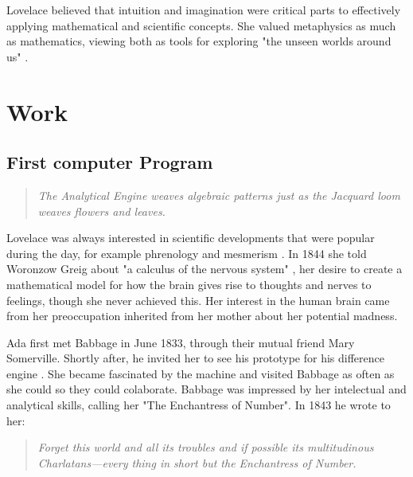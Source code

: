 \documentclass{article}
\begin{document}
Lovelace believed that intuition and imagination were critical parts to effectively applying mathematical and scientific concepts. She valued metaphysics as much as mathematics, viewing both as tools for exploring "the unseen worlds around us" \cite{Toole}.

\newpage

\section{Work}

\subsection{First computer Program}

\vspace*{\fill}
\begin{quote}
    \textit{
        The Analytical Engine weaves algebraic patterns just as the Jacquard loom weaves flowers and leaves.
    }
    \cite{AdaLovelaceBabbageEngine}
\end{quote}
\vspace*{\fill}

Lovelace was always interested in scientific developments that were popular during the day, for example phrenology \cite{Phrenology} and mesmerism \cite{Mesmerism}. In 1844 she told Woronzow Greig about "a calculus of the nervous system" \cite{CalculusOfNervousSystem}, her desire to create a mathematical model for how the brain gives rise to thoughts and nerves to feelings, though she never achieved this. Her interest in the human brain came from her preoccupation inherited from her mother about her potential madness.

\vspace{0.3cm}

Ada first met Babbage in June 1833, through their mutual friend Mary Somerville. Shortly after, he invited her to see his prototype for his difference engine \cite{Toole}. She became fascinated by the machine and visited Babbage as often as she could so they could colaborate. Babbage was impressed by her intelectual and analytical skills, calling her "The Enchantress of Number". In 1843 he wrote to her: \cite{Enchantress}
\begin{quote}
    \textit{
Forget this world and all its troubles and if possible its multitudinous Charlatans—every thing in short but the Enchantress of Number.
}
\end{quote}
\end{document}
